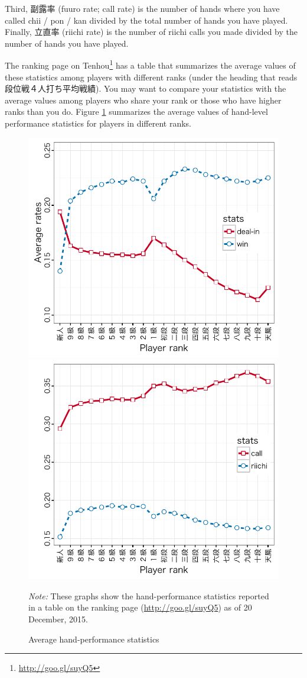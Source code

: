 \bigskip
Third, 副露率 ({\jap fuuro} rate; call rate) is the number of hands where you have called {\jap chii} / {\jap pon} / {\jap kan} divided by the total number of hands you have played. Finally, 立直率 (riichi rate) is the number of riichi calls you made divided by the number of hands you have played.

\bigskip

The ranking page on {\jap Tenhou}\footnote{\url{http://goo.gl/suyQ5}} has a table that summarizes the average values of these statistics among players with different ranks (under the heading that reads 段位戦４人打ち平均戦績). You may want to compare your statistics with the average values among players who share your rank or those who have higher ranks than you do. Figure \ref{fig:avg} summarizes the average values of hand-level performance statistics for players in different ranks.

\begin{figure}[t!] \captionsetup{font=small}
\begin{center}
\includegraphics[width=.50\textwidth,clip]{figs/stats_wd.pdf}\hspace{-7pt}
\includegraphics[width=.50\textwidth,clip]{figs/stats_cr.pdf}
\vspace{-10pt}
\caption{Average hand-performance statistics}\label{fig:avg}
\end{center}\vspace{-10pt}
{\footnotesize \textit{Note:} These graphs show the hand-performance statistics reported in a table on the ranking page (\url{http://goo.gl/suyQ5}) as of 20 December, 2015.}
\end{figure}

